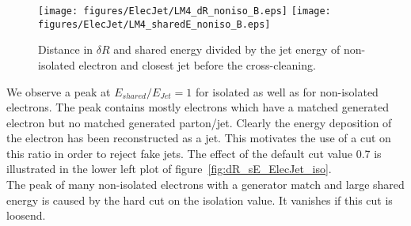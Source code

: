 \documentclass{cmspaper}
\begin{document}
\begin{figure}[hb]
\begin{center}
    \texttt{[image: figures/ElecJet/LM4\_dR\_noniso\_B.eps]}
    \texttt{[image: figures/ElecJet/LM4\_sharedE\_noniso\_B.eps]}
    \caption{Distance in $\delta R$ and shared energy divided by the jet energy of non-isolated electron and closest jet
before the cross-cleaning.}
\label{fig:dR_sE_ElecJet_noniso}
\end{center}
\end{figure}

We observe a peak at $E_{shared}/E_{Jet}=1$ for isolated as well as for
non-isolated electrons. The peak contains mostly electrons which have a matched
generated electron but no matched generated parton/jet. Clearly the energy
deposition of the electron has been reconstructed as a jet. This motivates the
use of a cut on this ratio in order to reject fake jets. The effect of the
default cut value 0.7 is illustrated in the lower left plot of
figure~\ref{fig:dR_sE_ElecJet_iso}.\\


The peak of many non-isolated electrons with a generator match and large shared energy is caused by the hard cut on the isolation value. It vanishes if this cut is loosend.

\end{document}
